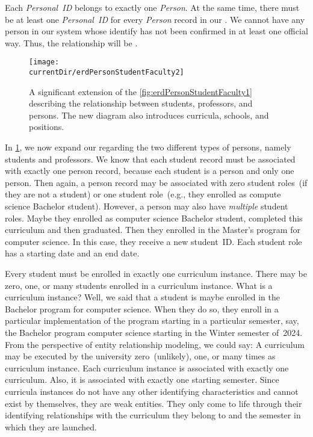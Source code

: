 Each \emph{Personal~ID} belongs to exactly one \emph{Person}.
At the same time, there must be at least one \emph{Personal~ID} for every \emph{Person} record in our \db.
We cannot have any person in our system whose identify has not been confirmed in at least one official way.
Thus, the relationship will be .

\begin{figure}%
\centering%
\texttt{[image: \\currentDir/erdPersonStudentFaculty2]}%
\caption{A significant extension of the \cref{fig:erdPersonStudentFaculty1}  describing the relationship between students, professors, and persons. %
The new diagram also introduces curricula, schools, and positions.}%
\label{fig:erdPersonStudentFaculty2}%
\end{figure}%

In \cref{fig:erdPersonStudentFaculty2}, we now expand our  regarding the two different types of persons, namely students and professors.
We know that each student record must be associated with exactly one person record, because each student is a person and only one person.
Then again, a person record may be associated with zero student roles~(if they are not a student) or one student role~(e.g., they enrolled as compute science Bachelor student).
However, a person may also have \emph{multiple} student roles.
Maybe they enrolled as computer science Bachelor student, completed this curriculum and then graduated.
Then they enrolled in the Master's program for computer science.
In this case, they receive a new student~ID.
Each student role has a starting date and an end date.

Every student must be enrolled in exactly one curriculum instance.
There may be zero, one, or many students enrolled in a curriculum instance.
What is a curriculum instance?
Well, we said that a student is maybe enrolled in the Bachelor program for computer science.
When they do so, they enroll in a particular implementation of the program starting in a particular semester, say, the Bachelor program computer science starting in the Winter semester of~2024.
From the perspective of entity relationship modeling, we could say:
A curriculum may be executed by the university zero~(unlikely), one, or many times as curriculum instance.
Each curriculum instance is associated with exactly one curriculum.
Also, it is associated with exactly one starting semester.
Since curricula instances do not have any other identifying characteristics and cannot exist by themselves, they are weak entities.
They only come to life through their identifying relationships with the curriculum they belong to and the semester in which they are launched.

